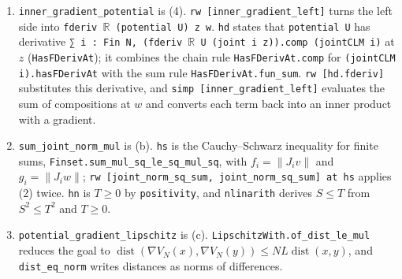 \documentclass[11pt,a4paper]{article}
\begin{document}
\begin{leanbox}
\begin{enumerate}
\item \texttt{inner\_\allowbreak{}gradient\_\allowbreak{}potential} is (4). \texttt{rw [inner\_\allowbreak{}gradient\_\allowbreak{}left]} turns the left side into \texttt{fderiv \ensuremath{\mathbb R} (potential U) z w}. \texttt{hd} states that \texttt{potential U} has derivative \texttt{∑ i : Fin N, (fderiv \ensuremath{\mathbb R} U (joint i z)).\allowbreak{}comp (joint\allowbreak{}CLM i)} at \(z\) (\texttt{Has\allowbreak{}FDeriv\allowbreak{}At}); it combines the chain rule \texttt{Has\allowbreak{}FDeriv\allowbreak{}At.\allowbreak{}comp} for \texttt{(joint\allowbreak{}CLM i).\allowbreak{}has\allowbreak{}FDeriv\allowbreak{}At} with the sum rule \texttt{Has\allowbreak{}FDeriv\allowbreak{}At.\allowbreak{}fun\_\allowbreak{}sum}. \texttt{rw [hd.\allowbreak{}fderiv]} substitutes this derivative, and \texttt{simp [inner\_\allowbreak{}gradient\_\allowbreak{}left]} evaluates the sum of compositions at \(w\) and converts each term back into an inner product with a gradient.

\item \texttt{sum\_\allowbreak{}joint\_\allowbreak{}norm\_\allowbreak{}mul} is (b). \texttt{hs} is the Cauchy–Schwarz inequality for finite sums, \texttt{Finset.\allowbreak{}sum\_\allowbreak{}mul\_\allowbreak{}sq\_\allowbreak{}le\_\allowbreak{}sq\_\allowbreak{}mul\_\allowbreak{}sq}, with \(f_i=\|J_iv\|\) and \(g_i=\|J_iw\|\); \texttt{rw [joint\_\allowbreak{}norm\_\allowbreak{}sq\_\allowbreak{}sum, joint\_\allowbreak{}norm\_\allowbreak{}sq\_\allowbreak{}sum] at hs} applies (2) twice. \texttt{hn} is \(T\ge0\) by \texttt{positivity}, and \texttt{nlinarith} derives \(S\le T\) from \(S^2\le T^2\) and \(T\ge0\).

\item \texttt{potential\_\allowbreak{}gradient\_\allowbreak{}lipschitz} is (c). \texttt{Lipschitz\allowbreak{}With.\allowbreak{}of\_\allowbreak{}dist\_\allowbreak{}le\_\allowbreak{}mul} reduces the goal to \(\operatorname{dist}(\nabla V_N(x),\nabla V_N(y))\le NL\operatorname{dist}(x,y)\), and \texttt{dist\_\allowbreak{}eq\_\allowbreak{}norm} writes distances as norms of differences.

\begin{itemize}



\end{itemize}
\end{enumerate}
\end{leanbox}
\end{document}
